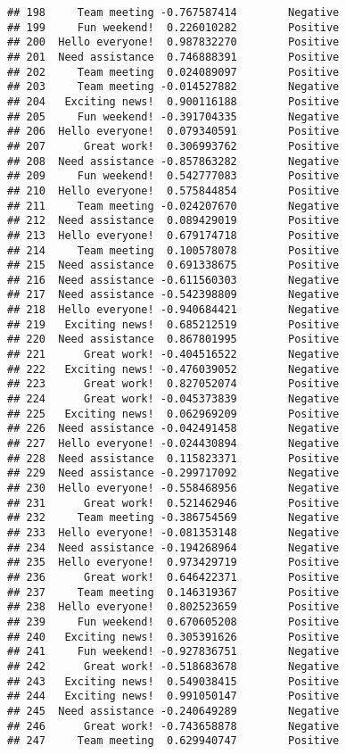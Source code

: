 \documentclass[
]{article}
\begin{document}
\begin{verbatim}
## 198     Team meeting -0.767587414        Negative
## 199     Fun weekend!  0.226010282        Positive
## 200  Hello everyone!  0.987832270        Positive
## 201  Need assistance  0.746888391        Positive
## 202     Team meeting  0.024089097        Positive
## 203     Team meeting -0.014527882        Negative
## 204   Exciting news!  0.900116188        Positive
## 205     Fun weekend! -0.391704335        Negative
## 206  Hello everyone!  0.079340591        Positive
## 207      Great work!  0.306993762        Positive
## 208  Need assistance -0.857863282        Negative
## 209     Fun weekend!  0.542777083        Positive
## 210  Hello everyone!  0.575844854        Positive
## 211     Team meeting -0.024207670        Negative
## 212  Need assistance  0.089429019        Positive
## 213  Hello everyone!  0.679174718        Positive
## 214     Team meeting  0.100578078        Positive
## 215  Need assistance  0.691338675        Positive
## 216  Need assistance -0.611560303        Negative
## 217  Need assistance -0.542398809        Negative
## 218  Hello everyone! -0.940684421        Negative
## 219   Exciting news!  0.685212519        Positive
## 220  Need assistance  0.867801995        Positive
## 221      Great work! -0.404516522        Negative
## 222   Exciting news! -0.476039052        Negative
## 223      Great work!  0.827052074        Positive
## 224      Great work! -0.045373839        Negative
## 225   Exciting news!  0.062969209        Positive
## 226  Need assistance -0.042491458        Negative
## 227  Hello everyone! -0.024430894        Negative
## 228  Need assistance  0.115823371        Positive
## 229  Need assistance -0.299717092        Negative
## 230  Hello everyone! -0.558468956        Negative
## 231      Great work!  0.521462946        Positive
## 232     Team meeting -0.386754569        Negative
## 233  Hello everyone! -0.081353148        Negative
## 234  Need assistance -0.194268964        Negative
## 235  Hello everyone!  0.973429719        Positive
## 236      Great work!  0.646422371        Positive
## 237     Team meeting  0.146319367        Positive
## 238  Hello everyone!  0.802523659        Positive
## 239     Fun weekend!  0.670605208        Positive
## 240   Exciting news!  0.305391626        Positive
## 241     Fun weekend! -0.927836751        Negative
## 242      Great work! -0.518683678        Negative
## 243   Exciting news!  0.549038415        Positive
## 244   Exciting news!  0.991050147        Positive
## 245  Need assistance -0.240649289        Negative
## 246      Great work! -0.743658878        Negative
## 247     Team meeting  0.629940747        Positive

\end{verbatim}
\end{document}
